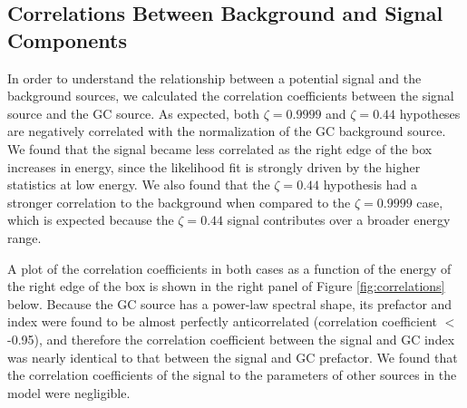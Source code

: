 \subsection{Correlations Between Background and Signal Components}\label{sec:correlations}

In order to understand the relationship between a potential signal and the background sources, we calculated the correlation coefficients between the signal source and the GC source.
As expected, both $\zeta=0.9999$ and $\zeta=0.44$ hypotheses are negatively correlated with the normalization of the GC background source.
We found that the signal became less correlated as the right edge of the box increases in energy, since the likelihood fit is strongly driven by the higher statistics at low energy.
We also found that the $\zeta=0.44$ hypothesis had a stronger correlation to the background when compared to the  $\zeta=0.9999$ case, which is expected because the $\zeta=0.44$ signal contributes over a broader energy range. 

A plot of the correlation coefficients in both cases as a function of the energy of the right edge of the box is shown in the right panel of Figure \ref{fig:correlations} below.
Because the GC source has a power-law spectral shape, its prefactor and index were found to be almost perfectly anticorrelated (correlation coefficient $<$-0.95), and therefore the correlation coefficient between the signal and GC index was nearly identical to that between the signal and GC prefactor.
We found that the correlation coefficients of the signal to the parameters of other sources in the model were negligible.

